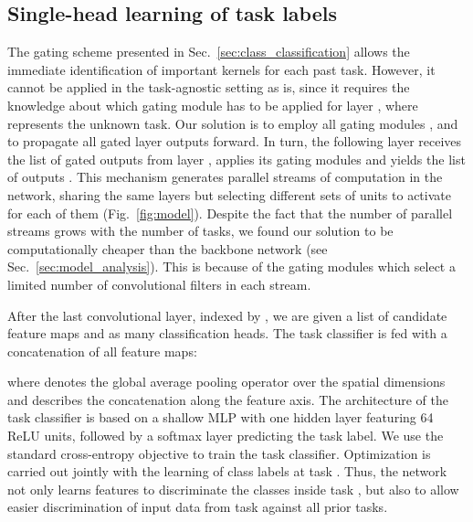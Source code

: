 \documentclass[10pt,twocolumn,letterpaper]{article}
\begin{document}
\subsection{Single-head learning of task labels}
\label{sec:task_classification}
\newcommand{\hhat}[2]{\hat{{\bf h}}^{#1}_{#2}}
\def\hcat{\\h}
The gating scheme presented in Sec.~\ref{sec:class_classification} allows the immediate identification of important kernels for each past task. However, it cannot be applied in the task-agnostic setting as is, since it requires the knowledge about which gating module  has to be applied for layer , where  represents the unknown task.
Our solution is to employ all gating modules , and to propagate all gated layer outputs  forward.
In turn, the following layer  receives the list of gated outputs from layer , applies its gating modules  and yields the list of outputs .
This mechanism generates parallel streams of computation in the network, sharing the same layers but selecting different sets of units to activate for each of them (Fig.~\ref{fig:model}).
Despite the fact that the number of parallel streams grows with the number of tasks, we found our solution to be computationally cheaper than the backbone network (see Sec.~\ref{sec:model_analysis}). This is because of the gating modules which select a limited number of convolutional filters in each stream.

After the last convolutional layer, indexed by , we are given a list of  candidate feature maps  and as many classification heads. The task classifier is fed with a concatenation of all feature maps:

where  denotes the global average pooling operator over the spatial dimensions and  describes the concatenation along the feature axis. 
The architecture of the task classifier is based on a shallow MLP with one hidden layer featuring 64 ReLU units, followed by a softmax layer predicting the task label. We use the standard cross-entropy objective to train the task classifier. Optimization is carried out jointly with the learning of class labels at task . Thus, the network not only learns features to discriminate the classes inside task , but also to allow easier discrimination of input data from task  against all prior tasks. 
\end{document}
